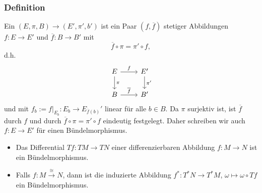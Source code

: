 \subsubsection[Definition: Bündelmorphismus]{Definition} %
\label{ssub:432}
Ein  $(E,\pi , B) \to (E', \pi', b')$  ist ein Paar $(f, \overline{f})$ stetiger Abbildungen $f : E \to E'$ und $\overline{f} : B \to B'$ mit
\[
	\overline{f} \circ \pi  = \pi' \circ f, 
\]
d.h. 
\[
	\begin{tikzcd}
		E \rar{f} \dar{\pi }& E' \dar{\pi'}\\
		B \rar{\overline{f}}& B'
	\end{tikzcd}
\]
und mit  $f_b := f\big|_{E_b} : E_{b} \to E_{\overline{f}(b) }'$ linear für alle $b \in B$.
Da $\pi $ surjektiv ist, ist $\overline{f}$ durch $f$ und durch $\overline{f} \circ \pi = \pi' \circ f $ eindeutig festgelegt. Daher schreiben wir auch $f : E \to E'$ für
einen Bündelmorphismus.
\begin{itemize}
	\item Das Differential $T f : TM \to TN$ einer differenzierbaren Abbildung $f : M \to N$ ist ein Bündelmorphismus.
	\item Falls $f : M \xrightarrow{\cong} N$, dann ist die induzierte Abbildung $f^* : T^*N \to T^* M$, $\omega \mapsto \omega \circ Tf$ ein Bündelmorphismus.
\end{itemize}

